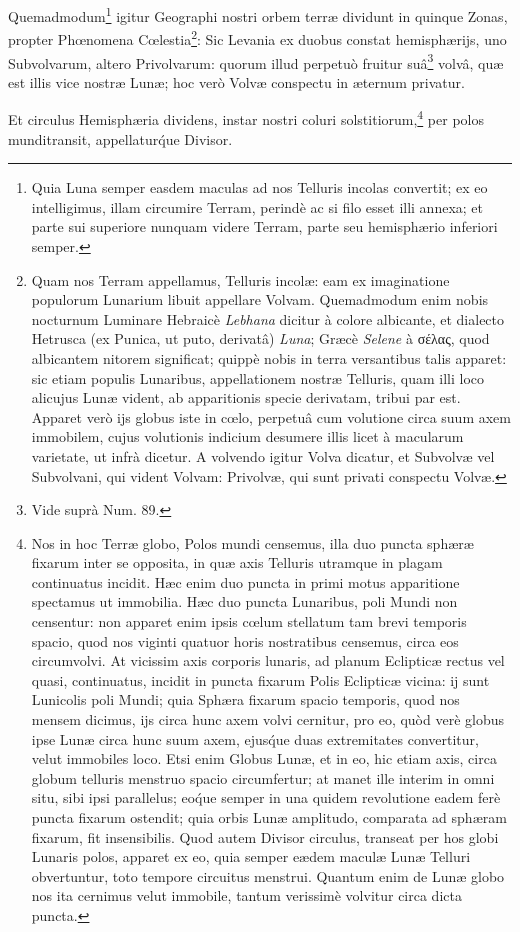 \documentclass[a4paper, 11pt, oneside, polutonikogreek, german]{article}
\begin{document}
Quemadmodum\footnote{Quia Luna semper easdem maculas ad nos Telluris incolas convertit; ex eo intelligimus, illam circumire Terram, perindè ac si filo esset illi annexa; et parte sui superiore nunquam videre Terram, parte seu hemisphærio inferiori semper.} igitur Geographi nostri orbem terræ dividunt in quinque Zonas, propter Phœnomena Cœlestia\footnote{Quam nos Terram appellamus, Telluris incolæ: eam ex imaginatione populorum Lunarium libuit appellare Volvam. Quemadmodum enim nobis nocturnum Luminare Hebraicè \emph{Lebhana} dicitur à colore albicante, et dialecto Hetrusca (ex Punica, ut puto, derivatâ) \emph{Luna}; Græcè \emph{Selene} à σέλας, quod albicantem nitorem significat; quippè nobis in terra versantibus talis apparet: sic etiam populis Lunaribus, appellationem nostræ Telluris, quam illi loco alicujus Lunæ vident, ab apparitionis specie derivatam, tribui par est. Apparet verò ijs globus iste in cœlo, perpetuâ cum volutione circa suum axem immobilem, cujus volutionis indicium desumere illis licet à macularum varietate, ut infrà dicetur. A volvendo igitur Volva dicatur, et Subvolvæ vel Subvolvani, qui vident Volvam: Privolvæ, qui sunt privati conspectu Volvæ.}: Sic Levania ex duobus constat hemisphærijs, uno Subvolvarum, altero Privolvarum: quorum illud perpetuò fruitur suâ\footnote{Vide suprà Num. 89.} volvâ, quæ est illis vice nostræ Lunæ; hoc verò Volvæ conspectu in æternum privatur.

Et circulus Hemisphæria dividens, instar nostri coluri solstitiorum,\footnote{Nos in hoc Terræ globo, Polos mundi censemus, illa duo puncta sphæræ fixarum inter se opposita, in quæ axis Telluris utramque in plagam continuatus incidit. Hæc enim duo puncta in primi motus apparitione spectamus ut immobilia. Hæc duo puncta Lunaribus, poli Mundi non censentur: non apparet enim ipsis cœlum stellatum tam brevi temporis spacio, quod nos viginti quatuor horis nostratibus censemus, circa eos circumvolvi. At vicissim axis corporis lunaris, ad planum Eclipticæ rectus vel quasi, continuatus, incidit in puncta fixarum Polis Eclipticæ vicina: ij sunt Lunicolis poli Mundi; quia Sphæra fixarum spacio temporis, quod nos mensem dicimus, ijs circa hunc axem volvi cernitur, pro eo, quòd verè globus ipse Lunæ circa hunc suum axem, ejus\'que duas extremitates convertitur, velut immobiles loco. Etsi enim Globus Lunæ, et in eo, hic etiam axis, circa globum telluris menstruo spacio circumfertur; at manet ille interim in omni situ, sibi ipsi parallelus; eo\'que semper in una quidem revolutione eadem ferè puncta fixarum ostendit; quia orbis Lunæ amplitudo, comparata ad sphæram fixarum, fit insensibilis. Quod autem Divisor circulus, transeat per hos globi Lunaris polos, apparet ex eo, quia semper eædem maculæ Lunæ Telluri obvertuntur, toto tempore circuitus menstrui. Quantum enim de Lunæ globo nos ita cernimus velut immobile, tantum verissimè volvitur circa dicta puncta.} per polos munditransit, appellatur\'que Divisor.
\end{document}
